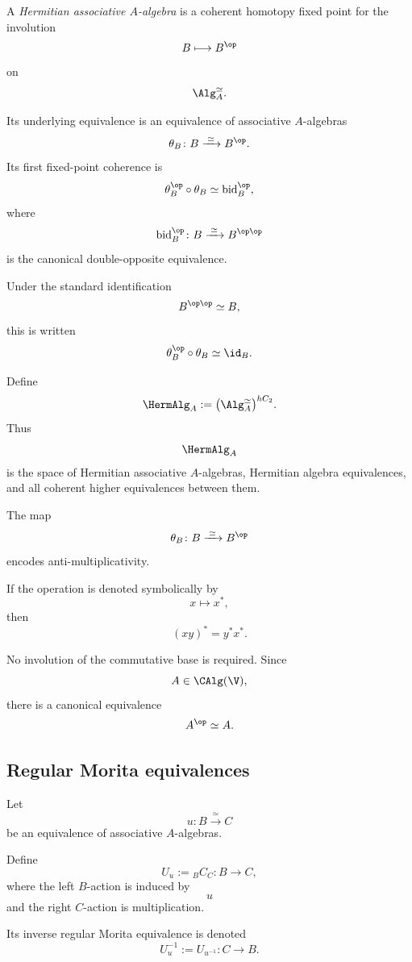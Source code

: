 \begin{definition}
\label{def:hermitian-associative-algebra}
A \emph{Hermitian associative $A$-algebra} is a coherent homotopy fixed
point for the involution
\[
    B
    \longmapsto
    B^{\op}
\]
on
\[
    \Alg_A^\simeq.
\]

Its underlying equivalence is an equivalence of associative
$A$-algebras
\[
    \theta_B
    \colon
    B
    \xrightarrow{\;\simeq\;}
    B^{\op}.
\]
Its first fixed-point coherence is
\[
    \theta_B^{\op}\circ\theta_B
    \simeq
    \operatorname{bid}^{\op}_B,
\]
where
\[
    \operatorname{bid}^{\op}_B
    \colon
    B
    \xrightarrow{\;\simeq\;}
    B^{\op\op}
\]
is the canonical double-opposite equivalence.

Under the standard identification
\[
    B^{\op\op}
    \simeq
    B,
\]
this is written
\[
    \theta_B^{\op}\circ\theta_B
    \simeq
    \id_B.
\]
\end{definition}

\begin{definition}
\label{def:space-hermitian-associative-algebras}
Define
\[
    \HermAlg_A
    :=
    \bigl(
        \Alg_A^\simeq
    \bigr)^{hC_2}.
\]
Thus
\[
    \HermAlg_A
\]
is the space of Hermitian associative $A$-algebras, Hermitian algebra
equivalences, and all coherent higher equivalences between them.
\end{definition}

\begin{remark}
\label{rem:opposite-essential-noncommutative}
The map
\[
    \theta_B
    \colon
    B
    \xrightarrow{\;\simeq\;}
    B^{\op}
\]
encodes anti-multiplicativity.

If the operation is denoted symbolically by
\[
    x
    \longmapsto
    x^*,
\]
then
\[
    (xy)^*
    =
    y^*x^*.
\]

No involution of the commutative base is required. Since
\[
    A\in\CAlg(\V),
\]
there is a canonical equivalence
\[
    A^{\op}
    \simeq
    A.
\]
\end{remark}

\subsection{Regular Morita equivalences}

\begin{construction}
\label{con:regular-bimodule-algebra-equivalence}
Let
\[
    u
    \colon
    B
    \xrightarrow{\;\simeq\;}
    C
\]
be an equivalence of associative $A$-algebras.

Define
\[
    U_u
    :=
    {}_B C_C
    \colon
    B
    \longrightarrow
    C,
\]
where the left $B$-action is induced by
\[
    u
\]
and the right $C$-action is multiplication.

Its inverse regular Morita equivalence is denoted
\[
    U_u^{-1}
    :=
    U_{u^{-1}}
    \colon
    C
    \longrightarrow
    B.
\]
\end{construction}

